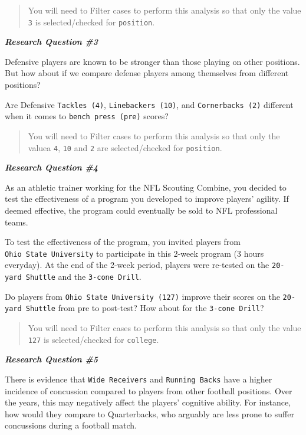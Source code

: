 \documentclass[11pt,]{article}
\begin{document}
\begin{quote}
You will need to Filter cases to perform this analysis so that only the
value \texttt{3} is selected/checked for \texttt{position}.
\end{quote}

\textbf{\emph{Research Question \#3}}

Defensive players are known to be stronger than those playing on other
positions. But how about if we compare defense players among themselves
from different positions?

Are Defensive \texttt{Tackles\ (4)}, \texttt{Linebackers\ (10)}, and
\texttt{Cornerbacks\ (2)} different when it comes to
\texttt{bench\ press\ (pre)} scores?

\begin{quote}
You will need to Filter cases to perform this analysis so that only the
valuea \texttt{4}, \texttt{10} and \texttt{2} are selected/checked for
\texttt{position}.
\end{quote}

\textbf{\emph{Research Question \#4}}

As an athletic trainer working for the NFL Scouting Combine, you decided
to test the effectiveness of a program you developed to improve players'
agility. If deemed effective, the program could eventually be sold to
NFL professional teams.

To test the effectiveness of the program, you invited players from
\texttt{Ohio\ State\ University} to participate in this 2-week program
(3 hours everyday). At the end of the 2-week period, players were
re-tested on the \texttt{20-yard\ Shuttle} and the
\texttt{3-cone\ Drill}.

Do players from \texttt{Ohio\ State\ University\ (127)} improve their
scores on the \texttt{20-yard\ Shuttle} from pre to post-test? How about
for the \texttt{3-cone\ Drill}?

\begin{quote}
You will need to Filter cases to perform this analysis so that only the
value \texttt{127} is selected/checked for \texttt{college}.
\end{quote}

\textbf{\emph{Research Question \#5}}

There is evidence that \texttt{Wide\ Receivers} and
\texttt{Running\ Backs} have a higher incidence of concussion compared
to players from other football positions. Over the years, this may
negatively affect the players' cognitive ability. For instance, how
would they compare to Quarterbacks, who arguably are less prone to
suffer concussions during a football match.
\end{document}
